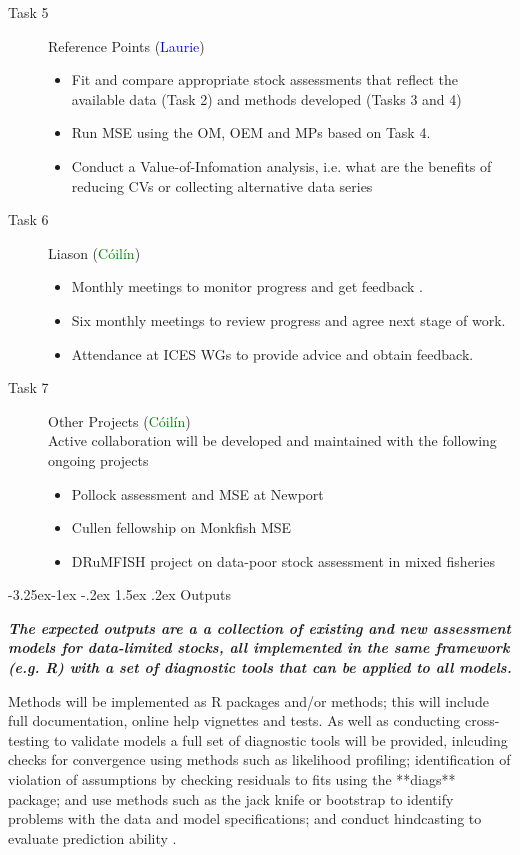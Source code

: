 \documentclass[a4paper, 10pt]{article}
\makeatletter
\newcommand{\laurie}{\textcolor{blue}}
\newcommand{\coilin}{\textcolor{green}}
\renewcommand{\subsection}{\@startsection{subsection}{2}{\z@}%
  {-3.25ex\@plus -1ex \@minus -.2ex}%
  {1.5ex \@plus .2ex}%
  {\normalfont\bfseries\slshape}}
\makeatother
\begin{document}
\begin{description}
\begin{itemize}
 \end{itemize} 
 \item[Task 5] Reference Points (\laurie{Laurie})
  \begin{itemize}
  \item Fit and compare appropriate stock assessments that reflect the available data (Task 2) and methods developed (Tasks 3 and 4)
  \item Run MSE using the OM, OEM and MPs based on Task 4.
  \item Conduct a Value-of-Infomation analysis, i.e. what are the benefits of reducing CVs or collecting alternative data series 
 \end{itemize}
 \item[Task 6] Liason (\coilin{C\'oil\'in})
 \begin{itemize}
  \item Monthly meetings to monitor progress and get feedback .
  \item Six monthly meetings to review progress and agree next stage of work.
  \item Attendance at ICES WGs to provide advice and obtain feedback.
 \end{itemize} 
 \item[Task 7] Other Projects (\coilin{C\'oil\'in})\\
  Active collaboration will be developed and maintained with the following ongoing projects
  \begin{itemize}
   \item Pollock assessment and MSE at Newport\\
  \item Cullen fellowship on Monkfish MSE\\   
   \item DRuMFISH project on data-poor stock assessment in mixed fisheries
 \end{itemize}

\end{description}

\newpage\subsection{Outputs}

\textit{\textbf{The expected outputs are a a collection of existing and new assessment models for data-limited stocks, all implemented in the same framework (e.g. R) with a set of diagnostic tools that can be applied to all models.}}

Methods will be implemented as R packages and/or methods; this will include full documentation, online help vignettes and tests. As well as conducting cross-testing to validate models a full set of diagnostic tools will be provided, inlcuding checks for convergence using methods such as likelihood profiling; identification of violation of assumptions by checking residuals to fits using the **diags** package; and use methods such as the jack knife or bootstrap to identify problems with the data and model specifications; and conduct hindcasting to evaluate prediction ability \citep{kell2016evaluation}.  
  
\end{document}
